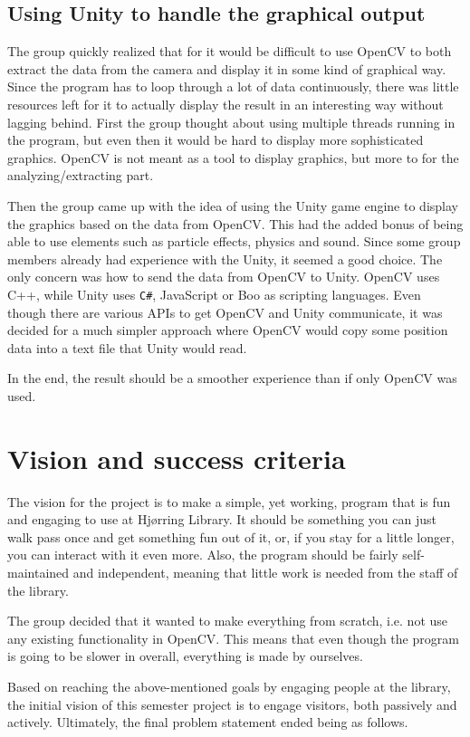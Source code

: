 \subsection{Using Unity to handle the graphical output}
The group quickly realized that for it would be difficult to use OpenCV to both extract the data from the camera and display it in some kind of graphical way. Since the program has to loop through a lot of data continuously, there was little resources left for it to actually display the result in an interesting way without lagging behind. First the group thought about using multiple threads running in the program, but even then it would be hard to display more sophisticated graphics. OpenCV is not meant as a tool to display graphics, but more to for the analyzing/extracting part.

Then the group came up with the idea of using the Unity game engine to display the graphics based on the data from OpenCV. This had the added bonus of being able to use elements such as particle effects, physics and sound. Since some group members already had experience with the Unity, it seemed a good choice. The only concern was how to send the data from OpenCV to Unity. OpenCV uses C++, while Unity uses \texttt{C\#}, JavaScript or Boo as scripting languages. Even though there are various APIs to get OpenCV and Unity communicate, it was decided for a much simpler approach where OpenCV would copy some position data into a text file that Unity would read.

In the end, the result should be a smoother experience than if only OpenCV was used.
  
\section{Vision and success criteria}
The vision for the project is to make a simple, yet working, program that is fun and engaging to use at Hj{\o}rring Library. It should be something you can just walk pass once and get something fun out of it, or, if you stay for a little longer, you can interact with it even more. Also, the program should be fairly self-maintained and independent, meaning that little work is needed from the staff of the library.

The group decided that it wanted to make everything from scratch, i.e. not use any existing functionality in OpenCV. This means that even though the program is going to be slower in overall, everything is made by ourselves.

Based on reaching the above-mentioned goals by engaging people at the library, the initial vision of this semester project is to engage visitors, both passively and actively. Ultimately, the final problem statement ended being as follows.


